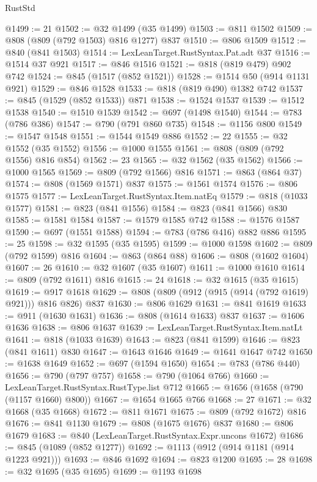 \begin{lexlean}{RustStd}
\begin{coremodule}
@1499 := 21
@1502 := @32 @1499 (@35 @1499)
@1503 := @811 @1502
@1509 := @808 (@809 (@792 @1503) @816 @1277) @837
@1510 := @806 @1509
@1512 := @840 (@841 @1503)
@1514 := LexLeanTarget.RustSyntax.Pat.adt @37
@1516 := @1514 @37 @921
@1517 := @846 @1516
@1521 := @818 (@819 @479) @902 @742
@1524 := @845 (@1517 (@852 @1521))
@1528 := @1514 @50 (@914 @1131 @921)
@1529 := @846 @1528
@1533 := @818 (@819 @490) @1382 @742
@1537 := @845 (@1529 (@852 @1533)) @871
@1538 := @1524 @1537
@1539 := @1512 @1538
@1540 := @1510 @1539
@1542 := @697 (@1498 @1540)
@1544 := @783 (@786 @386)
@1547 := @790 (@791 @860 @735)
@1548 := @1156 @800
@1549 := @1547 @1548
@1551 := @1544 @1549 @886
@1552 := 22
@1555 := @32 @1552 (@35 @1552)
@1556 := @1000 @1555
@1561 := @808 (@809 (@792 @1556) @816 @854)
@1562 := 23
@1565 := @32 @1562 (@35 @1562)
@1566 := @1000 @1565
@1569 := @809 (@792 @1566) @816
@1571 := @863 (@864 @37)
@1574 := @808 (@1569 @1571) @837
@1575 := @1561 @1574
@1576 := @806 @1575
@1577 := LexLeanTarget.RustSyntax.Item.natEq
@1579 := @818 (@1033 @1577)
@1581 := @823 (@841 @1556)
@1584 := @823 (@841 @1566) @830
@1585 := @1581 @1584
@1587 := @1579 @1585 @742
@1588 := @1576 @1587
@1590 := @697 (@1551 @1588)
@1594 := @783 (@786 @416) @882 @886
@1595 := 25
@1598 := @32 @1595 (@35 @1595)
@1599 := @1000 @1598
@1602 := @809 (@792 @1599) @816
@1604 := @863 (@864 @88)
@1606 := @808 (@1602 @1604)
@1607 := 26
@1610 := @32 @1607 (@35 @1607)
@1611 := @1000 @1610
@1614 := @809 (@792 @1611) @816
@1615 := 24
@1618 := @32 @1615 (@35 @1615)
@1619 := @917 @1618
@1629 := @808 (@809 (@912 (@915 (@914 (@792 @1619) @921))) @816 @826) @837
@1630 := @806 @1629
@1631 := @841 @1619
@1633 := @911 (@1630 @1631)
@1636 := @808 (@1614 @1633) @837
@1637 := @1606 @1636
@1638 := @806 @1637
@1639 := LexLeanTarget.RustSyntax.Item.natLt
@1641 := @818 (@1033 @1639)
@1643 := @823 (@841 @1599)
@1646 := @823 (@841 @1611) @830
@1647 := @1643 @1646
@1649 := @1641 @1647 @742
@1650 := @1638 @1649
@1652 := @697 (@1594 @1650)
@1654 := @783 (@786 @440)
@1656 := @790 (@797 @757)
@1658 := @790 (@1064 @766)
@1660 := LexLeanTarget.RustSyntax.RustType.list @712
@1665 := @1656 (@1658 (@790 (@1157 @1660) @800))
@1667 := @1654 @1665 @766
@1668 := 27
@1671 := @32 @1668 (@35 @1668)
@1672 := @811 @1671
@1675 := @809 (@792 @1672) @816
@1676 := @841 @1130
@1679 := @808 (@1675 @1676) @837
@1680 := @806 @1679
@1683 := @840 (LexLeanTarget.RustSyntax.Expr.uncons @1672)
@1686 := @845 (@1089 (@852 @1277))
@1692 := @1113 (@912 (@914 @1181 (@914 @1223 @921)))
@1693 := @846 @1692
@1694 := @823 @1200
@1695 := 28
@1698 := @32 @1695 (@35 @1695)
@1699 := @1193 @1698

\end{coremodule}
\end{lexlean}
